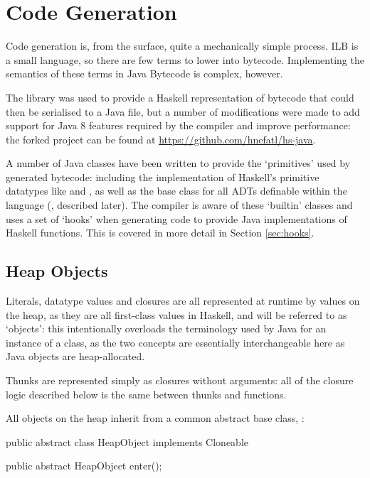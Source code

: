 \documentclass[dissertation.tex]{subfiles}
\begin{document}
\section{Code Generation}
{
    Code generation is, from the surface, quite a mechanically simple process. ILB is a small language, so there are few terms to lower into bytecode. Implementing the semantics of these terms in Java Bytecode is complex, however.

    The  library was used to provide a Haskell representation of bytecode that could then be serialised to a Java  file, but a number of modifications were made to add support for Java 8 features required by the compiler and improve performance: the forked project can be found at \url{https://github.com/hnefatl/hs-java}.

    A number of Java classes have been written to provide the `primitives' used by generated bytecode: including the implementation of Haskell's primitive datatypes like  and , as well as the base class for all ADTs definable within the language (, described later). The compiler is aware of these `builtin' classes and uses a set of `hooks' when generating code to provide Java implementations of Haskell functions. This is covered in more detail in Section \ref{sec:hooks}.

    \subsection{Heap Objects}\label{sec:heap-objects}
    {

        Literals, datatype values and closures are all represented at runtime by values on the heap, as they are all first-class values in Haskell, and will be referred to as `objects': this intentionally overloads the terminology used by Java for an instance of a class, as the two concepts are essentially interchangeable here as Java objects are heap-allocated.

        Thunks are represented simply as closures without arguments: all of the closure logic described below is the same between thunks and functions.

        All objects on the heap inherit from a common abstract base class, :

        \begin{javafigure}
        public abstract class HeapObject implements Cloneable {
            public abstract HeapObject enter();

}
\end{javafigure}}}
\end{document}
